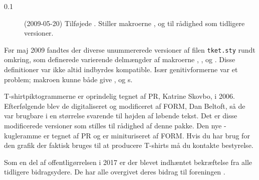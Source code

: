 \documentclass[a4paper,article,oneside,danish]{memoir}
\newcommand{\pakkenavn}[1]{\textsf{#1}}
\newcommand{\filnavn}[1]{\texttt{#1}}
\begin{document}
\begin{description}
\item[0.1] (2009-05-20) Tilføjede . Stiller
  makroerne ,  og  til rådighed som
  tidligere versioner.
\end{description}

Før maj 2009 fandtes der diverse unummererede versioner af filen
\filnavn{tket.sty} rundt omkring, som definerede varierende delmængder
af makroerne , ,  og . Disse
definitioner var ikke altid indbyrdes kompatible. Især genitivformerne
var et problem; makroen  kunne både give \TKETS, \TKETs og
\TKET{}s.

T-shirtpiktogrammerne er oprindelig tegnet af PR,
Katrine Skovbo, i 2006. Efterfølgende blev de digitaliseret og
modificeret af FORM, Dan Beltoft, så de var brugbare i
en størrelse svarende til højden af løbende tekst. Det er disse
modificerede versioner som stilles til rådighed af denne pakke.
Den nye \KASS{}-kugleramme er tegnet af PR og er minituriseret af FORM.
Hvis du har brug for den grafik der faktisk bruges til at producere T-shirts må
du kontakte \TKETs bestyrelse.

Som en del af offentligørrelsen i 2017 er der blevet indhæntet bekræftelse fra
alle tidligere bidragsydere. De har alle overgivet deres bidrag til foreningen
\TKET.
\end{document}
